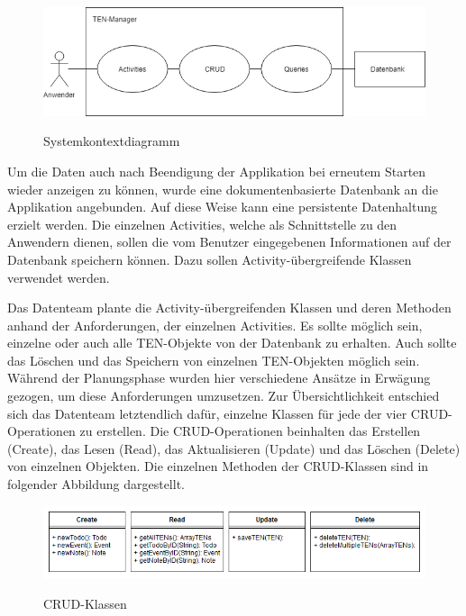\begin{figure}[H]
\centering
\begin{minipage}[t]{1\textwidth} %
\caption{Systemkontextdiagramm} %
\includegraphics[width=1\textwidth]{img/Systemkontextdiagramm}\\ %
\end{minipage}
\end{figure}

Um die Daten auch nach Beendigung der Applikation bei erneutem Starten wieder anzeigen zu können, wurde eine dokumentenbasierte Datenbank an die Applikation angebunden. Auf diese Weise kann eine persistente Datenhaltung erzielt werden. Die einzelnen Activities, welche als Schnittstelle zu den Anwendern dienen, sollen die vom Benutzer eingegebenen Informationen auf der Datenbank speichern können. Dazu sollen Activity-übergreifende Klassen verwendet werden.

Das Datenteam plante die Activity-übergreifenden Klassen und deren Methoden anhand der Anforderungen, der einzelnen Activities. Es sollte möglich sein, einzelne oder auch alle TEN-Objekte von der Datenbank zu erhalten. Auch sollte das Löschen und das Speichern von einzelnen TEN-Objekten möglich sein. Während der Planungsphase wurden hier verschiedene Ansätze in Erwägung gezogen, um diese Anforderungen umzusetzen. Zur Übersichtlichkeit entschied sich das Datenteam letztendlich dafür, einzelne Klassen für jede der vier CRUD-Operationen zu erstellen. Die CRUD-Operationen beinhalten das Erstellen (Create), das Lesen (Read), das Aktualisieren (Update) und das Löschen (Delete) von einzelnen Objekten. Die einzelnen Methoden der CRUD-Klassen sind in folgender Abbildung dargestellt.

\begin{figure}[H]
\centering
\begin{minipage}[t]{1\textwidth} %
\caption{CRUD-Klassen} %
\includegraphics[width=1\textwidth]{img/CRUD-Klassen}\\ %
\end{minipage}
\end{figure}

